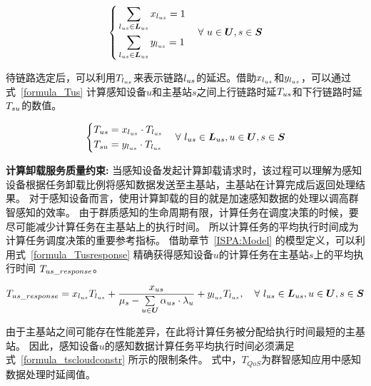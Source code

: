 \begin{equation}
  \label{formula_xusl1}
  \left\{
    \begin{aligned}
    &\sum_{l_{us} \in \boldsymbol{L}_{us}}x_{l_{us}} = 1\\
    &\sum_{l_{us} \in \boldsymbol{L}_{us}}y_{l_{us}} = 1
    \end{aligned}
  \right.
  \quad \forall \ u\in \boldsymbol{U}, s\in \boldsymbol{S}
\end{equation}

待链路选定后，可以利用$T_{l_{us}}$来表示链路$l_{us}$的延迟。借助$x_{l_{us}}$和$y_{l_{us}}$，可以通过式~\eqref{formula_Tus} 计算感知设备$u$和主基站$s$之间上行链路时延${T}_{us}$和下行链路时延${T}_{su}$的数值。

\begin{equation}
  \label{formula_Tus}
  \left\{
    \begin{aligned}
    &{T}_{us} = x_{l_{us}} \cdot T_{l_{us}}\\
    &{T}_{su} = y_{l_{us}} \cdot T_{l_{us}}
    \end{aligned}
  \right.
  \quad \forall \ l_{us} \in \boldsymbol{L}_{us}, u\in \boldsymbol{U}, s\in \boldsymbol{S}
\end{equation}

\textbf{计算卸载服务质量约束:}
当感知设备发起计算卸载请求时，该过程可以理解为感知设备根据任务卸载比例将感知数据发送至主基站，主基站在计算完成后返回处理结果。
对于感知设备而言，使用计算卸载的目的就是加速感知数据的处理以调高群智感知的效率。
由于群质感知的生命周期有限，计算任务在调度决策的时候，要尽可能减少计算任务在主基站上的执行时间。
所以计算任务的平均执行时间成为计算任务调度决策的重要参考指标。
借助章节~\ref{ISPA:Model} 的模型定义，可以利用式~\eqref{formula_Tusresponse} 精确获得感知设备$u$的计算任务在主基站$s$上的平均执行时间 ${T}_{us\_response}$。


\begin{equation}
\label{formula_Tusresponse}
\begin{gathered}
{T}_{us\_response} = x_{l_{us}} T_{l_{us}} + \frac{{x}_{us}}{{\mu}_{s}-\sum\limits_{u \in \boldsymbol{U}}{\alpha}_{us} \cdot {\lambda}_{u}} + y_{l_{us}} T_{l_{us}},
\quad \forall \ l_{us} \in \boldsymbol{L}_{us}, u\in \boldsymbol{U}, s\in \boldsymbol{S}
\end{gathered}
\end{equation}

由于主基站之间可能存在性能差异，在此将计算任务被分配给执行时间最短的主基站。
因此，感知设备$u$的感知数据计算任务平均执行时间必须满足式~\eqref{formula_tscloudconstr} 所示的限制条件。
式中，$T_{QoS}$为群智感知应用中感知数据处理时延阈值。

